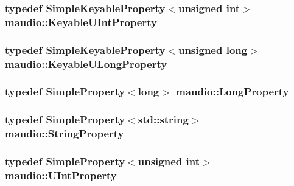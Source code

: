\hypertarget{namespacemaudio_a203aa8c73c37bdb4da0e1636d470de5b}{
\subsubsection[{Keyable\-U\-Int\-Property}]{\setlength{\rightskip}{0pt plus 5cm}typedef {\bf Simple\-Keyable\-Property}$<$unsigned int$>$ {\bf maudio\-::\-Keyable\-U\-Int\-Property}}}\label{namespacemaudio_a203aa8c73c37bdb4da0e1636d470de5b}
\hypertarget{namespacemaudio_a751b31106fc695d66e4e92c892238a8f}{
\subsubsection[{Keyable\-U\-Long\-Property}]{\setlength{\rightskip}{0pt plus 5cm}typedef {\bf Simple\-Keyable\-Property}$<$unsigned long$>$ {\bf maudio\-::\-Keyable\-U\-Long\-Property}}}\label{namespacemaudio_a751b31106fc695d66e4e92c892238a8f}
\hypertarget{namespacemaudio_af2bf8df1a7c9b8e1c1b3efc6619bc11e}{
\subsubsection[{Long\-Property}]{\setlength{\rightskip}{0pt plus 5cm}typedef {\bf Simple\-Property}$<$long$>$ {\bf maudio\-::\-Long\-Property}}}\label{namespacemaudio_af2bf8df1a7c9b8e1c1b3efc6619bc11e}
\hypertarget{namespacemaudio_aeff9567f322e0c11390c5f9627c43eeb}{
\subsubsection[{String\-Property}]{\setlength{\rightskip}{0pt plus 5cm}typedef {\bf Simple\-Property}$<$std\-::string$>$ {\bf maudio\-::\-String\-Property}}}\label{namespacemaudio_aeff9567f322e0c11390c5f9627c43eeb}
\hypertarget{namespacemaudio_a627db6d6ab669540c7aed4c1ac62f6ab}{
\subsubsection[{U\-Int\-Property}]{\setlength{\rightskip}{0pt plus 5cm}typedef {\bf Simple\-Property}$<$unsigned int$>$ {\bf maudio\-::\-U\-Int\-Property}}}\label{namespacemaudio_a627db6d6ab669540c7aed4c1ac62f6ab}
